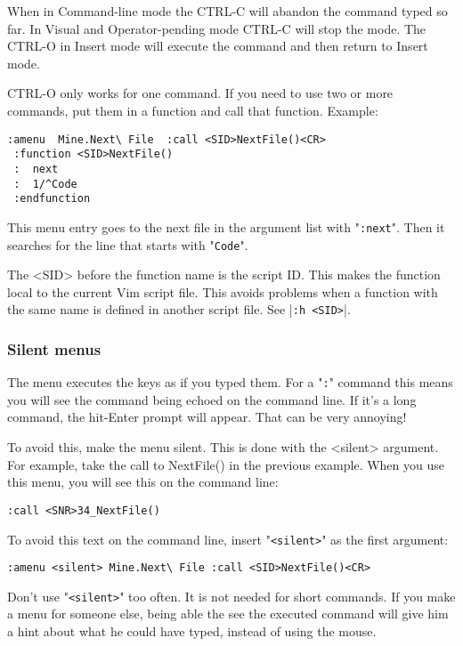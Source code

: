 When in Command-line mode the CTRL-C will abandon the command typed so far.
In Visual and Operator-pending mode CTRL-C will stop the mode.
The CTRL-O in Insert mode will execute the command and then return to Insert mode.

CTRL-O only works for one command.
If you need to use two or more commands, put them in a function and call that function.
Example:

\begin{Verbatim}[samepage=true]
 :amenu  Mine.Next\ File  :call <SID>NextFile()<CR>
 :function <SID>NextFile()
 :  next
 :  1/^Code
 :endfunction
\end{Verbatim}

This menu entry goes to the next file in the argument list with "\verb!:next!".
Then it searches for the line that starts with "\verb!Code!".

The <SID> before the function name is the script ID.
This makes the function local to the current Vim script file.
This avoids problems when a function with the same name is defined in another script file.
See |\verb!:h <SID>!|.

\subsubsection{Silent menus}
The menu executes the {keys} as if you typed them.
For a "\verb!:!" command this means you will see the command being echoed on the command line.
If it's a long command, the hit-Enter prompt will appear.
That can be very annoying!

To avoid this, make the menu silent.
This is done with the <silent> argument.
For example, take the call to NextFile() in the previous example.
When you use this menu, you will see this on the command line:

\begin{Verbatim}[samepage=true]
    :call <SNR>34_NextFile() 
\end{Verbatim}

To avoid this text on the command line, insert "\verb!<silent>!" as the first argument:

\begin{Verbatim}[samepage=true]
 :amenu <silent> Mine.Next\ File :call <SID>NextFile()<CR>
\end{Verbatim}

Don't use "\verb!<silent>!" too often.
It is not needed for short commands.
If you make a menu for someone else, being able the see the executed command will give him a hint about what he could have typed, instead of using the mouse.

